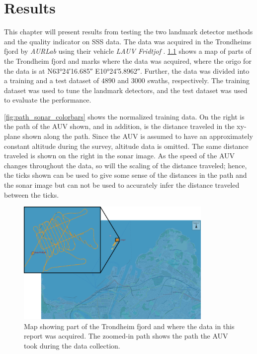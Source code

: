 \chapter{Results}

This chapter will present results from testing the two landmark detector methods and the quality indicator on SSS data. The data was acquired in the Trondheims fjord by \textit{AURLab} using their vehicle \textit{LAUV Fridtjof} \cite{LAUVNTNU}. \cref{fig:neptus_screenshot} shows a map of parts of the Trondheim fjord and marks where the data was acquired, where the origo for the data is at N\ang{63;24;16.685} E\ang{10;24;5.8962}. Further, the data was divided into a training and a test dataset of $4890$ and $3000$ swaths, respectively. The training dataset was used to tune the landmark detectors, and the test dataset was used to evaluate the performance. 

\cref{fig:path_sonar_colorbars} shows the normalized training data. On the right is the path of the AUV shown, and in addition, is the distance traveled in the xy-plane shown along the path. Since the AUV is assumed to have an approximately constant altitude during the survey, altitude data is omitted. The same distance traveled is shown on the right in the sonar image. As the speed of the AUV changes throughout the data, so will the scaling of the distance traveled; hence, the ticks shown can be used to give some sense of the distances in the path and the sonar image but can not be used to accurately infer the distance traveled between the ticks. 

\begin{figure} [h!]%
  \centering
  \includegraphics[width=0.84\textwidth]{figures/hercules_data.png}
  \caption{Map showing part of the Trondheim fjord and where the data in this report was acquired. The zoomed-in path shows the path the AUV took during the data collection. }
  \label{fig:neptus_screenshot}
\end{figure}

